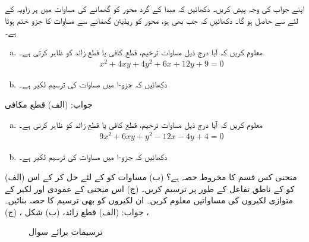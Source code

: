 اپنے جواب کی وجہ پیش کریں۔
دکھائیں کہ مبدا کے گرد محور کو گھمانے کی مساوات  میں ہر زاویہ  کے لئے  سے  حاصل ہو گا۔
دکھائیں کہ جب بھی  ہو، محور کو  ریڈیئن گھمانے سے مساوات  کا  جزو ختم ہوتا ہے۔
\begin{enumerate}[a.]
\item
معلوم کریں کہ آیا درج ذیل مساوات ترخیم، قطع کافی یا قطع زائد کو ظاہر کرتی ہے۔
\begin{align*}
x^2+4xy+4y^2+6x+12y+9=0
\end{align*}
\item
دکھائیں کہ جزو-ا میں مساوات کی ترسیم لکیر  ہے۔
\end{enumerate}
جواب:\quad
(الف) قطع مکافی
\begin{enumerate}[a.]
\item
معلوم کریں کہ آیا درج ذیل مساوات ترخیم، قطع کافی یا قطع زائد کو ظاہر کرتی ہے۔
\begin{align*}
9x^2+6xy+y^2-12x-4y+4=0
\end{align*}
\item
دکھائیں کہ جزو-ا میں مساوات کی ترسیم لکیر  ہے۔
\end{enumerate}
(الف) منحنی  کس قسم کا مخروط حصہ ہے؟ (ب) مساوات  کو  کے لئے حل کر کے اس کو  کے ناطق تفاعل کے طور پر ترسیم کریں۔ (ج) اس منحنی کے عمودی اور لکیر  کے متوازی لکیروں کی مساواتیں معلوم کریں۔ ان لکیروں کو بھی ترسیم کا حصہ بنائیں۔\\
جواب:\quad
(الف) قطع زائد، (ب) شکل ، (ج) ، 
\begin{figure}
\centering
{}
\caption{ترسیمات برائے سوال }
\label{شکل_سوال_مخروط_پہچان_قسم}
\end{figure}

